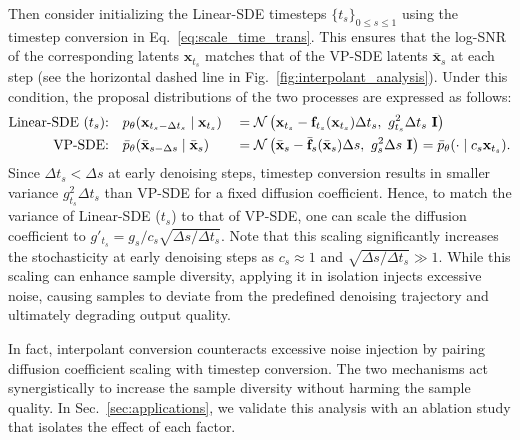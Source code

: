 Then consider initializing the Linear-SDE timesteps $\{t_s\}_{0 \le s \le 1}$ using the timestep conversion in Eq.~\ref{eq:scale_time_trans}.
This ensures that the log-SNR of the corresponding latents $\mathbf{x}_{t_s}$ matches that of the VP-SDE latents $\bar{\mathbf{x}}_s$ at each step (see the horizontal dashed line in Fig.~\ref{fig:interpolant_analysis}). 
Under this condition, the proposal distributions of the two processes are expressed as follows:
\begin{alignat}{2}
    \nonumber
    \text{Linear-SDE ($t_s$):} \quad 
    & p_\theta(\B{x}_{t_s - \Delta t_s} \mid \B{x}_{t_s}) 
    &&= \mathcal{N} \left( \B{x}_{t_s} - \B{f}_{t_s}(\B{x}_{t_s}) \Delta t_s,\ g_{t_s}^2 \Delta t_s\ \mathbf{I} \right) \\
    \nonumber
    \text{VP-SDE:} \quad 
    & \Bar{p}_\theta(\Bar{\B{x}}_{s - \Delta s} \mid \Bar{\B{x}}_s) 
    &&= \mathcal{N} \left( \Bar{\B{x}}_s - \Bar{\B{f}}_{s}(\Bar{\B{x}}_{s}) \Delta s,\ 
    g_s^2 \Delta s\ \mathbf{I} \right) = \Bar{p}_\theta(\cdot \mid c_s \B{x}_{t_s}). 
\end{alignat}
% 
Since $\Delta t_s < \Delta s$ at early denoising steps, timestep conversion results in smaller variance $g_{t_s}^2 \Delta t_s$ than VP-SDE for a fixed diffusion coefficient. 
% 
Hence, to match the variance of Linear-SDE ($t_s$) to that of VP-SDE, one can scale the diffusion coefficient to $g'_{t_s} = g_s/c_s \sqrt{\Delta s / \Delta t_s}$. 
% 
Note that this scaling significantly increases the stochasticity at early denoising steps as $c_s \approx 1$ and $\sqrt{\Delta s / \Delta t_s} \gg 1$. 
% 
While this scaling can enhance sample diversity, applying it in isolation injects excessive noise, causing samples to deviate from the predefined denoising trajectory and ultimately degrading output quality. 


In fact, interpolant conversion counteracts excessive noise injection by pairing diffusion coefficient scaling with timestep conversion. 
The two mechanisms act synergistically to increase the sample diversity without harming the sample quality. 
In Sec.~\ref{sec:applications}, we validate this analysis with an ablation study that isolates the effect of each factor. 


